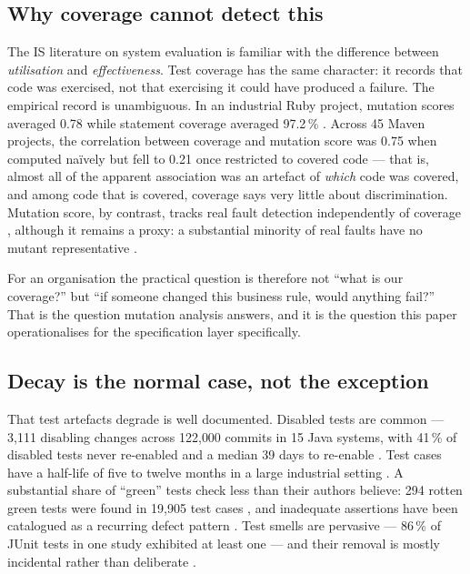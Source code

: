 \subsection{Why coverage cannot detect this}

The IS literature on system evaluation is familiar with the difference between \emph{utilisation} and
\emph{effectiveness}. Test coverage has the same character: it records that code was exercised, not
that exercising it could have produced a failure. The empirical record is unambiguous. In an
industrial Ruby project, mutation scores averaged 0.78 while statement coverage averaged 97.2\,\%
\citep{li2015mutationpracticeruby}. Across 45 Maven projects, the correlation between coverage and
mutation score was 0.75 when computed na\"ively but fell to 0.21 once restricted to covered code
\citep{Jain2023MindTheGap} --- that is, almost all of the apparent association was an artefact of
\emph{which} code was covered, and among code that is covered, coverage says very little about
discrimination. Mutation score, by contrast, tracks real fault detection independently of coverage
\citep{Just2014AreMutants}, although it remains a proxy: a substantial minority of real faults have no
mutant representative \citep{Just2014AreMutants,titcheuchekam2017faultrevelation}.

For an organisation the practical question is therefore not ``what is our coverage?'' but ``if
someone changed this business rule, would anything fail?'' That is the question mutation analysis
answers, and it is the question this paper operationalises for the specification layer specifically.

\subsection{Decay is the normal case, not the exception}

That test artefacts degrade is well documented. Disabled tests are common --- 3{,}111 disabling changes
across 122{,}000 commits in 15 Java systems, with 41\,\% of disabled tests never re-enabled and a
median 39 days to re-enable \citep{Kim2021Disabled}. Test cases have a half-life of five to twelve
months in a large industrial setting \citep{Feldt2014GrowOld}. A substantial share of ``green'' tests
check less than their authors believe: 294 rotten green tests were found in 19{,}905 test cases
\citep{Delplanque2019RottenGreen}, and inadequate assertions have been catalogued as a recurring
defect pattern \citep{zhi2013inadequateassertions,zhang2015assertions}. Test smells are pervasive ---
86\,\% of JUnit tests in one study exhibited at least one \citep{Bavota2015AreTestSmells} --- and their
removal is mostly incidental rather than deliberate \citep{Kim2021SecretLife}.

